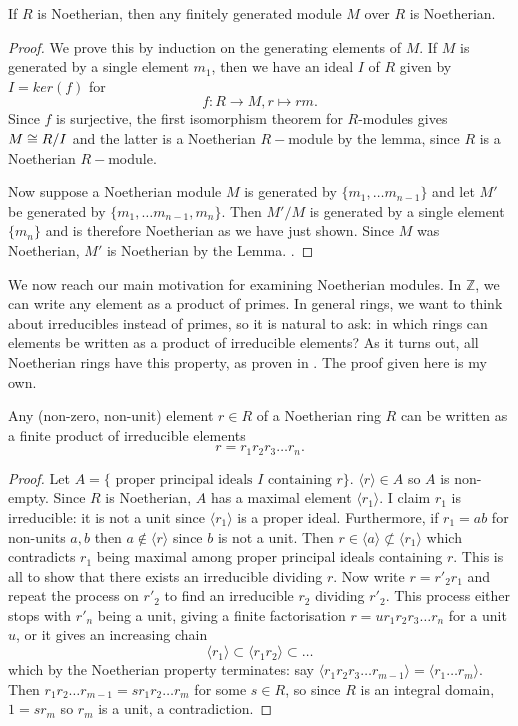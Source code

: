 \begin{corollary}\label{finitely-gen-module-Noetherian}
If $R$ is Noetherian, then any finitely generated module $M$ over $R$ is Noetherian.
\end{corollary}
\begin{proof}
We prove this by induction on the generating elements of $M$. If $M$ is generated by a single element $m_1$, then we have an ideal $I$ of $R$ given by $I=ker(f)$ for $$f:R\rightarrow M, r\mapsto rm.$$ Since $f$ is surjective, the first isomorphism theorem for $R$-modules gives $M\cong R/I$ and the latter is a Noetherian $R-$module by the lemma, since $R$ is a Noetherian $R-$module.

Now suppose a Noetherian module $M$ is generated by $\{m_1,\dots m_{n-1}\}$ and let $M'$ be generated by $\{m_1,\dots m_{n-1}, m_n\}$. Then $M'/M$ is generated by a single element $\{m_n\}$ and is therefore Noetherian as we have just shown. Since $M$ was Noetherian, $M'$ is Noetherian by the Lemma.
\cite{Wright}. 
\end{proof}

We now reach our main motivation for examining Noetherian modules. 
In $\mathbb{Z}$, we can write any element as a product of primes. In general rings, we want to think about irreducibles instead of primes, so it is natural to ask: in which rings can elements be written as a product of irreducible elements? As it turns out, all Noetherian rings have this property, as proven in \cite{Wright}. The proof given here is my own.
\begin{lemma}\label{noetherian-irreducible-elements}
Any (non-zero, non-unit) element $r\in R$ of a Noetherian ring $R$ can be written as a finite product of irreducible elements
$$r=r_1r_2r_3\dots r_n.$$
\end{lemma}
\begin{proof}
Let $A=\{\text{ proper principal ideals } I \text{ containing } r\}$. $\langle r \rangle \in A$ so $A$ is non-empty. Since $R$ is Noetherian, $A$ has a maximal element $\langle r_1\rangle$. I claim $r_1$ is irreducible: it is not a unit since $\langle r_1 \rangle$ is a proper ideal. Furthermore, if $r_1=ab$ for non-units $a,b$ then $a\not\in \langle r \rangle$ since $b$ is not a unit. Then $r\in \langle a \rangle \not \subset \langle r_1 \rangle$ which contradicts $r_1$ being maximal among proper principal ideals containing $r$. This is all to show that there exists an irreducible dividing $r$. Now write $r=r'_2r_1$ and repeat the process on $r'_2$ to find an irreducible $r_2$ dividing $r'_2$. This process either stops with $r'_n$ being a unit, giving a finite factorisation $r=u r_1r_2r_3\dots r_n$ for a unit $u$, or it gives an increasing chain
$$\langle r_1\rangle\subset \langle r_1r_2\rangle \subset \dots$$ which by the Noetherian property terminates: say $\langle r_1r_2r_3\dots r_{m-1}\rangle = \langle r_1\dots r_m\rangle$. Then $r_1r_2\dots r_{m-1}=sr_1r_2\dots r_m$ for some $s\in R$, so since $R$ is an integral domain, $1=sr_{m}$ so $r_m$ is a unit, a contradiction.
\end{proof}

